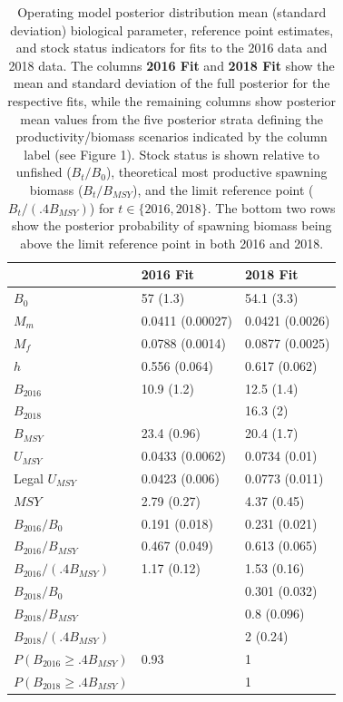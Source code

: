 \documentclass[11pt]{book}
\begin{document}
\begingroup\fontsize{12}{14}\selectfont
\begin{longtable}[t]{lll}
\caption{\label{tab:unnamed-chunk-5}Operating model posterior distribution mean (standard deviation) biological parameter, 
reference point estimates, and stock status indicators for fits to the 2016 data 
and 2018 data. The columns \textbf{2016 Fit} and \textbf{2018 Fit} show the mean 
and standard deviation of the full posterior for the respective fits, while the remaining columns 
show posterior mean values from the five posterior strata defining the productivity/biomass 
scenarios indicated by the column label (see Figure 1). Stock status is shown relative to 
unfished ($B_t/B_0$), theoretical
most productive spawning biomass ($B_t/B_{MSY}$), and the limit reference point 
($B_t/(.4B_{MSY})$) for $t \in \{2016, 2018\}$. The bottom
two rows show the posterior probability of spawning biomass 
being above the limit reference point in both 2016 and 2018.}\\
\toprule
\textbf{ } & \textbf{2016 Fit} & \textbf{2018 Fit}\\
\midrule
$B_0$ & 57 (1.3) & 54.1 (3.3)\\
$M_m$ & 0.0411 (0.00027) & 0.0421 (0.0026)\\
$M_f$ & 0.0788 (0.0014) & 0.0877 (0.0025)\\
$h$ & 0.556 (0.064) & 0.617 (0.062)\\
$B_{2016}$ & 10.9 (1.2) & 12.5 (1.4)\\
$B_{2018}$ &  & 16.3 (2)\\
$B_{MSY}$ & 23.4 (0.96) & 20.4 (1.7)\\
$U_{MSY}$ & 0.0433 (0.0062) & 0.0734 (0.01)\\
Legal $U_{MSY}$ & 0.0423 (0.006) & 0.0773 (0.011)\\
$MSY$ & 2.79 (0.27) & 4.37 (0.45)\\
$B_{2016}/B_0$ & 0.191 (0.018) & 0.231 (0.021)\\
$B_{2016}/B_{MSY}$ & 0.467 (0.049) & 0.613 (0.065)\\
$B_{2016}/(.4B_{MSY})$ & 1.17 (0.12) & 1.53 (0.16)\\
$B_{2018}/B_0$ &  & 0.301 (0.032)\\
$B_{2018}/B_{MSY}$ &  & 0.8 (0.096)\\
$B_{2018}/(.4B_{MSY})$ &  & 2 (0.24)\\
$P(B_{2016} \geq .4B_{MSY})$ & 0.93 & 1\\
$P(B_{2018} \geq .4B_{MSY})$ &  & 1\\
\bottomrule
\end{longtable}
\endgroup{}
\end{document}
